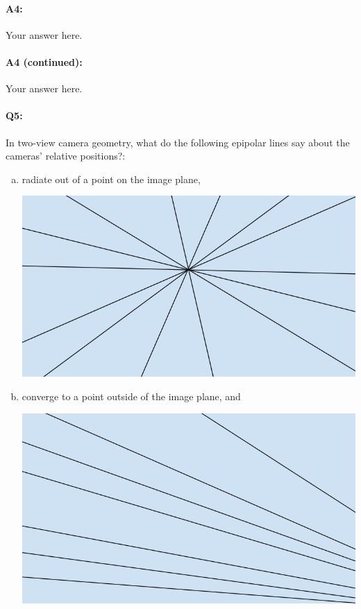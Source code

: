 \paragraph{A4:} Your answer here.









\pagebreak
\paragraph{A4 (continued):} Your answer here.



\pagebreak
\paragraph{Q5:} In two-view camera geometry, what do the following epipolar lines say about the cameras' relative positions?:
\begin{enumerate}[(a)]
\item radiate out of a point on the image plane,

\includegraphics[width = 0.25\linewidth]{q3-a.PNG}
\item converge to a point outside of the image plane, and

\includegraphics[width = 0.25\linewidth]{q3-b.PNG}
\end{enumerate}


